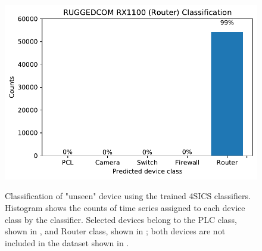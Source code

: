 \begin{figure}[h]
\begin{minipage}[c]{0.49\linewidth}
        {  \includegraphics[width=\textwidth]{images/results/4sics_clasf_router_recognition.pdf}
            \label{fig:4sics_unseen_router}
        }
    \end{minipage}%
    \caption{Classification of "unseen" device using the trained 4SICS classifiers. Histogram shows the counts of time series assigned to each device class by the classifier. Selected devices belong to the PLC class, shown in , and Router class, shown in ; both devices are not included in the dataset shown in .}
            \label{fig:4sics_unseen}
\end{figure}


